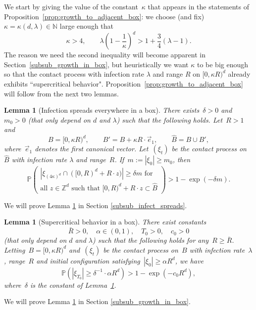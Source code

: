 \documentclass[a4paper,12pt]{article}
\newtheorem  {lemma}         [theorem]{Lemma}
\newcommand{\Z}{\mathbb{Z}}
\begin{document}
We start by giving the value of the constant~$\kappa$ that appears in the statements of Proposition~\ref{prop:growth_to_adjacent_box}:
we choose (and fix)~$\kappa=\kappa(d,\lambda) \in \mathbb{N}$ large enough that
\begin{equation}
\label{eq:choice_of_kappa}
\kappa > 4,\qquad \lambda \left(1-\frac{1}{\kappa}\right)^d > 1 + \frac{3}{4}(\lambda - 1).
\end{equation}
The reason we need the second inequality will become apparent in Section~\ref{subsub_growth_in_box}, but heuristically we want
$\kappa$ to be big enough so that the contact process with infection rate $\lambda$ and range $R$ on $[0, \kappa R)^d$ already exhibits ``supercritical behavior".
 Proposition~\ref{prop:growth_to_adjacent_box} will follow from the next two lemmas.

\begin{lemma}[Infection spreads everywhere in a box]\label{lem:infect_small_boxes}
There exists~$\delta > 0$ and~$m_0 > 0$ (that only depend on $d$ and $\lambda$) such that the following holds. Let~$R > 1$ and
\begin{equation}\label{B_B_prime_B_hat_again}
B = [0,\kappa R)^d,\qquad B' = B + \kappa R \cdot \vec{e}_1,\qquad \widehat{B} = B \cup B',
\end{equation}
where~$\vec{e}_1$ denotes the first canonical vector. Let~$(\xi_t)$ be the contact process on~$\widehat{B}$ with infection rate $\lambda$ and range~$R$. If~$m := |\xi_0| \geq m_0$, then
\begin{equation}\label{eq_infect_small_boxes}
  \mathbb{P}\left(\begin{array}{l}
|\xi_{(4\kappa)^d} \cap ([0,R)^d + R\cdot z )| \geq \delta m \text{ for } \\[.15cm] \text{all~$z \in \Z^d$ such that } [0,R)^d + R\cdot z \subset \widehat{B}
\end{array}\right) > 1-\exp(-\delta m).
\end{equation}
\end{lemma}
We will prove Lemma \ref{lem:infect_small_boxes} in Section \ref{subsub_infect_spreads}.


\begin{lemma}[Supercritical behavior in a box]
\label{lem:growth_in_box}
There exist constants
\begin{equation}\label{bar_R_alpha_T_0_c_0}
 \bar{R} > 0,\quad \alpha \in (0,1),\quad T_0 > 0, \quad c_0 > 0
 \end{equation}
(that only depend on $d$ and $\lambda$) such that the following holds  for any~$R \geq \bar{R}$. Letting~$B = [0,\kappa R)^d$ and~$(\xi_t)$ be the contact process on~$B$ with infection rate~$\lambda$, range~$R$ and initial configuration satisfying~$|\xi_0| \geq \alpha R^d$, we have
\begin{equation}\label{eq:growth_in_box}
\mathbb{P}\left(|\xi_{T_0}| \geq \delta^{-1} \cdot \alpha  R^d\right) > 1 - \exp(-c_0 R^d),
\end{equation}
where~$\delta$ is the constant of Lemma~\ref{lem:infect_small_boxes}.
\end{lemma}
We will prove Lemma \ref{lem:growth_in_box} in Section \ref{subsub_growth_in_box}.
\end{document}
